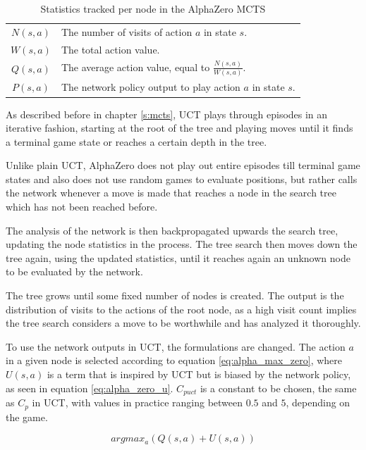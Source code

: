 \documentclass[12pt,onecolumn,oneside,titlepage]{article}
\begin{document}
\begin{table} [H]
 \centering
  \begin{tabular}{ c l }
  $N(s,a)$ & The number of visits of action $a$ in state $s$. \\ 
  $W(s,a)$ & The total action value. \\  
  $Q(s, a)$ & The average action value, equal to $\frac{N(s,a)}{W(s,a)}$. \\
  $P(s,a)$ & The network policy output to play action $a$ in state $s$.
  \end{tabular}
  \caption{Statistics tracked per node in the AlphaZero MCTS}
  \label{t:mcts_stats_values}
\end{table}

As described before in chapter \ref{s:mcts}, UCT plays through episodes in an iterative fashion, starting at the root of the tree and playing moves until it finds a terminal game state or reaches a certain depth in the tree.

Unlike plain UCT, AlphaZero does not play out entire episodes till terminal game states and also does not use random games to evaluate positions, but rather calls the network whenever a move is made that reaches a node in the search tree which has not been reached before.

The analysis of the network is then backpropagated upwards the search tree, updating the node statistics in the process. The tree search then moves down the tree again, using the updated statistics, until it reaches again an unknown node to be evaluated by the network.

The tree grows until some fixed number of nodes is created. The output is the distribution of visits to the actions of the root node, as a high visit count implies the tree search considers a move to be worthwhile and has analyzed it thoroughly.

To use the network outputs in UCT, the formulations are changed. The action $a$ in a given node is selected according to equation \ref{eq:alpha_max_zero}, where $U(s,a)$ is a term that is inspired by UCT but is biased by the network policy, as seen in equation \ref{eq:alpha_zero_u}.
$C_{puct}$ is a constant to be chosen, the same as $C_p$ in UCT, with values in practice ranging between $0.5$ and $5$, depending on the game.

\begin{equation}
 argmax_a(Q(s, a) + U(s, a))\label{eq:alpha_max_zero}
\end{equation}
\end{document}
